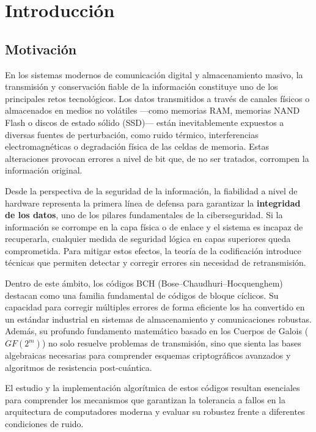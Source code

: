 \chapter{Introducción}

\section{Motivación}

En los sistemas modernos de comunicación digital y almacenamiento masivo, la transmisión y conservación fiable de la información constituye uno de los principales retos tecnológicos. Los datos transmitidos a través de canales físicos o almacenados en medios no volátiles —como memorias RAM, memorias NAND Flash o discos de estado sólido (SSD)— están inevitablemente expuestos a diversas fuentes de perturbación, como ruido térmico, interferencias electromagnéticas o degradación física de las celdas de memoria. Estas alteraciones provocan errores a nivel de bit que, de no ser tratados, corrompen la información original.

Desde la perspectiva de la seguridad de la información, la fiabilidad a nivel de hardware representa la primera línea de defensa para garantizar la \textbf{integridad de los datos}, uno de los pilares fundamentales de la ciberseguridad. Si la información se corrompe en la capa física o de enlace y el sistema es incapaz de recuperarla, cualquier medida de seguridad lógica en capas superiores queda comprometida. Para mitigar estos efectos, la teoría de la codificación introduce técnicas que permiten detectar y corregir errores sin necesidad de retransmisión.

Dentro de este ámbito, los códigos BCH (Bose–Chaudhuri–Hocquenghem) destacan como una familia fundamental de códigos de bloque cíclicos. Su capacidad para corregir múltiples errores de forma eficiente los ha convertido en un estándar industrial en sistemas de almacenamiento y comunicaciones robustas. Además, su profundo fundamento matemático basado en los Cuerpos de Galois ($GF(2^m)$) no solo resuelve problemas de transmisión, sino que sienta las bases algebraicas necesarias para comprender esquemas criptográficos avanzados y algoritmos de resistencia post-cuántica.

El estudio y la implementación algorítmica de estos códigos resultan esenciales para comprender los mecanismos que garantizan la tolerancia a fallos en la arquitectura de computadores moderna y evaluar su robustez frente a diferentes condiciones de ruido.

